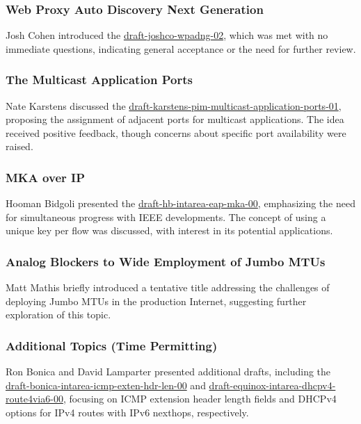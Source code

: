 \documentclass{article}
\begin{document}
\subsubsection{Web Proxy Auto Discovery Next Generation}
Josh Cohen introduced the \href{https://datatracker.ietf.org/doc/html/draft-joshco-wpadng-02}{draft-joshco-wpadng-02}, which was met with no immediate questions, indicating general acceptance or the need for further review.

\subsubsection{The Multicast Application Ports}
Nate Karstens discussed the \href{https://datatracker.ietf.org/doc/html/draft-karstens-pim-multicast-application-ports-01}{draft-karstens-pim-multicast-application-ports-01}, proposing the assignment of adjacent ports for multicast applications. The idea received positive feedback, though concerns about specific port availability were raised.

\subsubsection{MKA over IP}
Hooman Bidgoli presented the \href{https://datatracker.ietf.org/doc/html/draft-hb-intarea-eap-mka-00}{draft-hb-intarea-eap-mka-00}, emphasizing the need for simultaneous progress with IEEE developments. The concept of using a unique key per flow was discussed, with interest in its potential applications.

\subsubsection{Analog Blockers to Wide Employment of Jumbo MTUs}
Matt Mathis briefly introduced a tentative title addressing the challenges of deploying Jumbo MTUs in the production Internet, suggesting further exploration of this topic.

\subsubsection{Additional Topics (Time Permitting)}
Ron Bonica and David Lamparter presented additional drafts, including the \href{https://datatracker.ietf.org/doc/html/draft-bonica-intarea-icmp-exten-hdr-len-00}{draft-bonica-intarea-icmp-exten-hdr-len-00} and \href{https://datatracker.ietf.org/doc/html/draft-equinox-intarea-dhcpv4-route4via6-00}{draft-equinox-intarea-dhcpv4-route4via6-00}, focusing on ICMP extension header length fields and DHCPv4 options for IPv4 routes with IPv6 nexthops, respectively.
\end{document}
